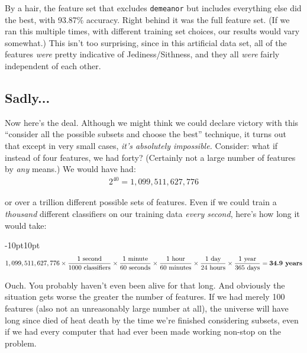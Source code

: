 By a hair, the feature set that excludes \texttt{demeanor} but includes
everything else did the best, with 93.87\% accuracy. Right behind it was the
full feature set. (If we ran this multiple times, with different training set
choices, our results would vary somewhat.) This isn't too surprising, since in
this artificial data set, all of the features \textit{were} pretty indicative
of Jediness/Sithness, and they all \textit{were} fairly independent of each
other.

\subsection{Sadly...}

Now here's the deal. Although we might think we could declare victory with
this ``consider all the possible subsets and choose the best'' technique, it
turns out that except in very small cases, \textit{it's absolutely
impossible.} Consider: what if instead of four features, we had forty?
(Certainly not a large number of features by \textit{any} means.) We would
have had:
\begin{align*}
2^{40} = 1,099,511,627,776
\end{align*}

or over a trillion different possible sets of features. Even if we could train
a \textit{thousand} different classifiers on our training data \textit{every
second}, here's how long it would take:

\footnotesize
\begin{adjustwidth}{-10pt}{10pt}
\begin{align*}
1,099,511,627,776 \times 
    \frac{1\ \textrm{second}}{1000\ \textrm{classifiers}} \times
    \frac{1\ \textrm{minute}}{60\ \textrm{seconds}} \times
    \frac{1\ \textrm{hour}}{60\ \textrm{minutes}} \times
    \frac{1\ \textrm{day}}{24\ \textrm{hours}} \times
    \frac{1\ \textrm{year}}{365\ \textrm{days}} = \textrm{\textbf{34.9\ years}}
\end{align*}
\end{adjustwidth}

\normalsize
Ouch. You probably haven't even been alive for that long. And obviously the
situation gets worse the greater the number of features. If we had merely 100
features (also not an unreasonably large number at all), the universe will
have long since died of heat death by the time we're finished considering
subsets, even if we had every computer that had ever been made working
non-stop on the problem.

